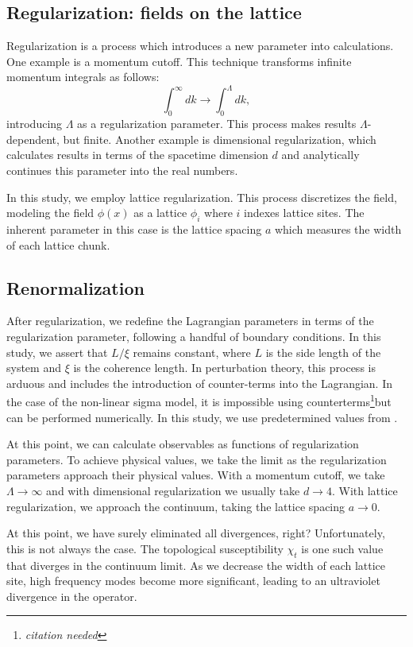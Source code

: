 \documentclass[12pt]{report}
\newcommand{\citeneeded}{\footnote{\textit{citation needed}}}
\begin{document}
\subsection{Regularization: fields on the lattice}
Regularization is a process which introduces a new parameter into calculations. One example is a momentum cutoff. This technique transforms infinite momentum integrals as follows:  
\begin{equation*}
    \int_0^\infty dk \rightarrow \int_0^\Lambda dk,
\end{equation*}
introducing $\Lambda$ as a regularization parameter. This process makes results $\Lambda$-dependent, but finite. Another example is dimensional regularization, which calculates results in terms of the spacetime dimension $d$ and analytically continues this parameter into the real numbers. 

In this study, we employ lattice regularization. This process discretizes the field, modeling the field $\phi(x)$ as a lattice $\phi_i$ where $i$ indexes lattice sites. The inherent parameter in this case is the lattice spacing $a$ which measures the width of each lattice chunk.

\subsection{Renormalization}
After regularization, we redefine the Lagrangian parameters in terms of the regularization parameter, following a handful of boundary conditions. In this study, we assert that $L/\xi$ remains constant, where $L$ is the side length of the system and $\xi$ is the coherence length. In perturbation theory, this process is arduous and includes the introduction of counter-terms into the Lagrangian. In the case of the non-linear sigma model, it is impossible using counterterms\citeneeded but can be performed numerically. In this study, we use predetermined values from \cite{bietenholz2018}.

At this point, we can calculate observables as functions of regularization parameters. To achieve physical values, we take the limit as the regularization parameters approach their physical values. With a momentum cutoff, we take $\Lambda \rightarrow \infty$ and with dimensional regularization we usually take $d\rightarrow 4$. With lattice regularization, we approach the continuum, taking the lattice spacing $a\rightarrow 0$. 

At this point, we have surely eliminated all divergences, right? Unfortunately, this is not always the case. The topological susceptibility $\chi_t$ is one such value that diverges in the continuum limit. As we decrease the width of each lattice site, high frequency modes become more significant, leading to an ultraviolet divergence in the operator. 
\end{document}

